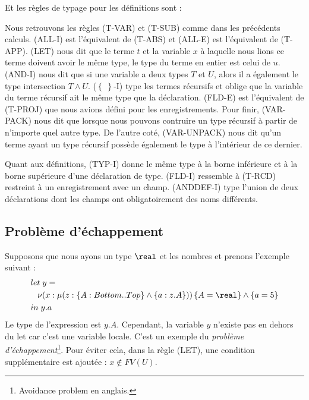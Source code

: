 Et les règles de typage pour les définitions sont :


Nous retrouvons les règles (T-VAR) et (T-SUB) comme dans les précédents calculs.
(ALL-I) est l'équivalent de (T-ABS) et (ALL-E) est l'équivalent de (T-APP).
(LET) nous dit que le terme $t$ et la variable $x$ à laquelle nous lions ce
terme doivent avoir le même type, le type du terme en entier est celui de $u$.
(AND-I) nous dit que si une variable a deux types $T$ et $U$, alors il a
également le type intersection $T \wedge U$. ($\left\{ \; \right\}$-I) type les termes
récursifs et oblige que la variable du terme récursif ait le même type que la déclaration.
(FLD-E) est l'équivalent de (T-PROJ) que nous avions défini pour les
enregistrements.
Pour finir, (VAR-PACK) nous dit que lorsque nous pouvons
contruire un type récursif à partir de n'importe quel autre type. De l'autre
coté, (VAR-UNPACK) nous dit qu'un terme ayant un type récursif possède également
le type à l'intérieur de ce dernier.

Quant aux définitions, (TYP-I) donne le même type à la borne inférieure et à la
borne supérieure d'une déclaration de type. (FLD-I) ressemble à (T-RCD)
restreint à un enregistrement avec un champ. (ANDDEF-I) type l'union de deux
déclarations dont les champs ont obligatoirement des noms différents.

\subsection*{Problème d'échappement}

Supposons que nous ayons un type $\real$ et les nombres et prenons l'exemple suivant :
\begin{align*}
  & let \; y = \\
  &\; \; \; \nu(x : \mu(z : \left\{ A : Bottom .. Top \right\} \wedge \left\{ a : z.A \right\})) \left\{ A = \real \right\} \wedge \left\{ a = 5 \right\} \\
  & in \; y.a
\end{align*}
Le type de l'expression est $y.A$. Cependant, la variable $y$ n'existe pas en
dehors du let car c'est une variable locale. C'est un exemple du
\textit{problème d'échappement}\footnote{\og Avoidance problem \fg \; en
anglais.}. Pour éviter cela, dans la règle (LET), une condition supplémentaire
est ajoutée : $x \notin FV(U)$.

